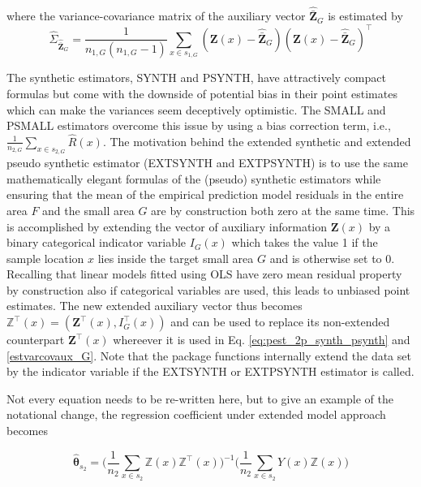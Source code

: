 \documentclass[article]{jss}
\begin{document}
where the variance-covariance matrix of the auxiliary vector $\hat{\bar{\pmb{Z}}}_G$ is estimated by
\begin{equation}\label{estvarcovaux_G}
\hat{\Sigma}_{\hat{\bar{\pmb{Z}}}_{G}}=
\frac{1}{n_{1,G}(n_{1,G}-1)}\sum_{x\in{s_{1,G}}}
(\pmb{Z}(x)-\hat{\bar{\pmb{Z}}}_{G})(\pmb{Z}(x)-\hat{\bar{\pmb{Z}}}_{G})^{\top}
\end{equation}


The synthetic estimators, SYNTH and PSYNTH, have attractively compact formulas but come with the downside of potential bias in their point estimates which can make the variances seem deceptively optimistic. The SMALL and PSMALL estimators overcome this issue by using a bias correction term, i.e., $\frac{1}{n_{2,G}}\sum_{x \in s_{2,G}}\hat{R}(x)$. The motivation behind the extended synthetic and extended pseudo synthetic estimator (EXTSYNTH and EXTPSYNTH) is to use the same mathematically elegant formulas of the (pseudo) synthetic estimators while ensuring that the mean of the empirical prediction model residuals in the entire area $F$ and the small area $G$ are by construction both zero at the same time. This is accomplished by extending the vector of auxiliary information $\pmb{Z}(x)$ by a binary categorical indicator variable $I_G(x)$ which takes the value 1 if the sample location $x$ lies inside the target small area $G$ and is otherwise set to 0. Recalling that linear models fitted using OLS have zero mean residual property by construction also if categorical variables are used, this leads to unbiased point estimates. The new extended auxiliary vector thus becomes $\pmb{\mathbb{Z}}^{\top}(x)=(\pmb{Z}^{\top}(x),I^{\top}_G(x))$ and can be used to replace its non-extended counterpart $\pmb{Z}^{\top}(x)$ whereever it is used in Eq. \ref{eq:pest_2p_synth_psynth} and \ref{estvarcovaux_G}. Note that the package functions internally extend the data set by the indicator variable if the EXTSYNTH or EXTPSYNTH estimator is called.

Not every equation needs to be re-written here, but to give an example of the notational change, the regression coefficient under extended model approach becomes

\begin{equation}\label{ext_normequ_simple}
  \hat{\pmb{\theta}}_{s_2}=\Big(\frac{1}{n_2}\sum_{x\in{s_2}}\pmb{\mathbb{Z}}(x)\pmb{\mathbb{Z}}^{\top}(x) \Big)^{-1} \Big(\frac{1}{n_2}\sum_{x\in{s_2}}Y(x)\pmb{\mathbb{Z}}(x)\Big)
\end{equation}
\end{document}
